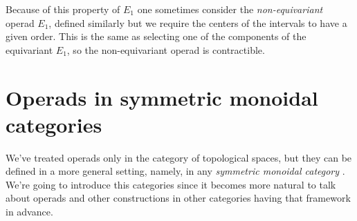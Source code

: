 \documentclass[TFM.tex]{subfiles}
\begin{document}
Because of this property of $E_1$ one sometimes consider the \emph{non-equivariant} operad $E_1$, defined similarly but we require the centers of the intervals to have a given order. This is the same as selecting one of the components of the equivariant $E_1$, so the non-equivariant operad is contractible. 







\section{Operads in symmetric monoidal categories}
We've treated operads only in the category of topological spaces, but they can be defined in a more general setting, namely, in any \emph{symmetric monoidal category} \cite{Yau}. We're going to introduce this categories since it becomes more natural to talk about operads and other constructions in other categories having that framework in advance.
\end{document}

